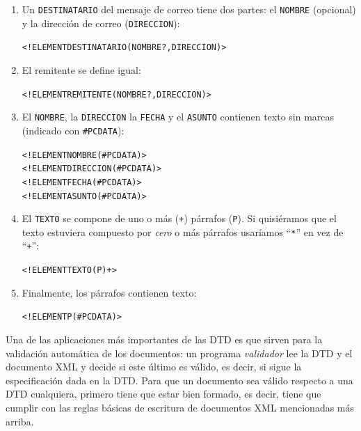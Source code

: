 \begin{enumerate}
\item Un \texttt{DESTINATARIO} del mensaje de correo tiene dos partes: el \texttt{NOMBRE} (opcional) y la dirección de correo (\texttt{DIRECCION}): \begin{small}\begin{alltt} <!ELEMENT DESTINATARIO (NOMBRE?, DIRECCION)> \end{alltt}\end{small} \item El remitente se define igual: \begin{small}\begin{alltt} <!ELEMENT REMITENTE (NOMBRE?, DIRECCION)> \end{alltt}\end{small} \item El \texttt{NOMBRE}, la \texttt{DIRECCION} la \texttt{FECHA} y el \texttt{ASUNTO} contienen texto sin marcas (indicado con \texttt{\#PCDATA}): 
\begin{small}\begin{alltt} 
<!ELEMENT NOMBRE (#PCDATA)> 
<!ELEMENT DIRECCION (#PCDATA)> 
<!ELEMENT FECHA (#PCDATA)> 
<!ELEMENT ASUNTO (#PCDATA)> \end{alltt}\end{small} 

\item El \texttt{TEXTO} se compone de uno o más (\texttt{+}) párrafos (\texttt{P}). Si quisiéramos que el texto estuviera compuesto por \emph{cero} o más párrafos usaríamos ``\texttt{*}'' en vez de ``\texttt{+}'': \begin{small}\begin{alltt} <!ELEMENT TEXTO (P)+> \end{alltt}\end{small} 

\item Finalmente, los párrafos contienen texto: \begin{small}\begin{alltt} <!ELEMENT P (#PCDATA)> \end{alltt}\end{small} \end{enumerate} 

Una de las aplicaciones más importantes de las DTD es que sirven para la validación automática de los documentos: un programa \emph{validador} lee la DTD y el documento XML y decide si este último es válido, es decir, si sigue la especificación dada en la DTD. Para que un documento sea válido respecto a una DTD cualquiera, primero tiene que estar bien formado, es decir, tiene que cumplir con las reglas básicas de escritura de documentos XML mencionadas más arriba. 

